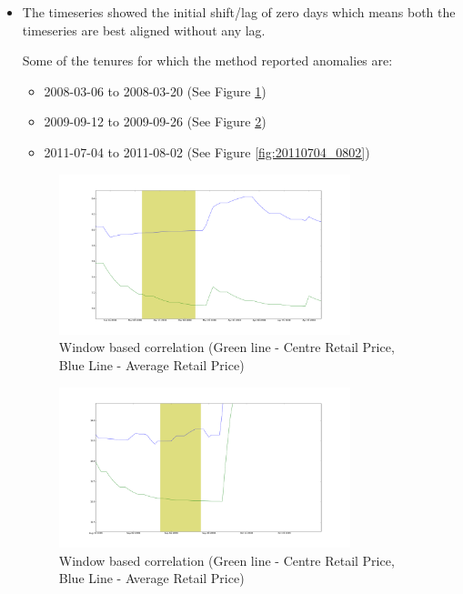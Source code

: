 \documentclass[a4paper,10pt]{report}
\begin{document}
		\begin{itemize}
			\item The timeseries showed the initial shift/lag of zero days which means both the timeseries are best aligned without any lag.
			
			Some of the tenures for which the method reported anomalies are:
			
			\begin{itemize}
				\item 2008-03-06 to 2008-03-20 (See Figure \ref{fig:20080306_0320})
				\item 2009-09-12 to 2009-09-26 (See Figure \ref{fig:20090912_0926})
				\item 2011-07-04 to 2011-08-02 (See Figure \ref{fig:20110704_0802})
			\end{itemize}
			\begin{figure}[H]
		    	\centering
  		    	\includegraphics[width=0.8\textwidth]{graphs/20080306_0320.png}
		    	\caption{Window based correlation (Green line - Centre Retail Price, Blue Line - Average Retail Price)}
		    	\label{fig:20080306_0320}
			\end{figure}
			
			\begin{figure}[H]
		    	\centering
  		    	\includegraphics[width=0.8\textwidth]{graphs/20090912_0926.png}
		    	\caption{Window based correlation (Green line - Centre Retail Price, Blue Line - Average Retail Price)}
		    	\label{fig:20090912_0926}
			\end{figure}


\end{itemize}
\end{document}
